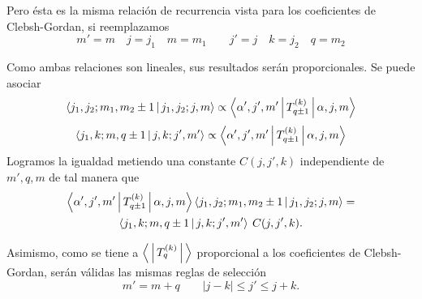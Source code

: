 \documentclass[10pt,oneside]{CBFT_book}
\begin{document}
Pero ésta es la misma relación de recurrencia vista para los coeficientes de Clebsh-Gordan, 
si reemplazamos
\[
	m'=m \quad j=j_1 \quad m=m_1 \qquad j'=j \quad k=j_2 \quad q=m_2
\]

Como ambas relaciones son lineales, sus resultados serán proporcionales. Se puede asociar 
\[
	\Braket{ j_1, j_2 ; m_1, m_2 \pm 1 | j_1, j_2 ; j, m} \propto 
	\Braket{\alpha',j',m'|T^{(k)}_{q\pm 1}|\alpha,j,m}
\]
\[
	\Braket{ j_1, k ; m, q \pm 1 | j, k ; j', m'} \propto 
	\Braket{\alpha',j',m'|T^{(k)}_{q\pm 1}|\alpha,j,m}
\]
Logramos la igualdad metiendo una constante $C(j,j',k)$ independiente de $m',q,m$ de tal manera
que
\begin{multline*}
	\Braket{\alpha',j',m'|T^{(k)}_{q\pm 1}|\alpha,j,m}
	\Braket{ j_1, j_2 ; m_1, m_2 \pm 1 | j_1, j_2 ; j, m} = \\
	\Braket{ j_1, k ; m, q \pm 1 | j, k ; j', m'} \: C(j,j',k).
\end{multline*}

Asimismo, como se tiene a $\Braket{|T_q^{(k)}|}$ proporcional a los coeficientes de Clebsh-Gordan, 
serán válidas las mismas reglas de selección 
\[
	m' = m + q \qquad |j-k| \leq j' \leq j+k.
\]
\end{document}
